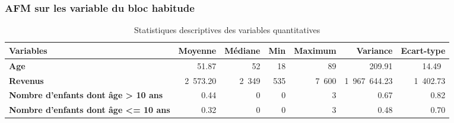 \documentclass[11pt,a4paper, x11names]{article}\usepackage[]{graphicx}\usepackage[]{color}
\makeatletter
\newenvironment{kframe}{%
 \def\at@end@of@kframe{}%
 \ifinner\ifhmode%
  \def\at@end@of@kframe{\end{minipage}}%
  \begin{minipage}{\columnwidth}%
 \fi\fi%
 \def\FrameCommand##1{\hskip\@totalleftmargin \hskip-\fboxsep
 \colorbox{shadecolor}{##1}\hskip-\fboxsep
     \hskip-\linewidth \hskip-\@totalleftmargin \hskip\columnwidth}%
 \MakeFramed {\advance\hsize-\width
   \@totalleftmargin\z@ \linewidth\hsize
   \@setminipage}}%
 {\par\unskip\endMakeFramed%
 \at@end@of@kframe}
\newenvironment{knitrout}{}{} %
\makeatother
\begin{document}
\subsubsection{AFM sur les variable du bloc habitude}
\begin{minipage}{0.49\linewidth}
\begin{mdframed}
\begin{knitrout}
\color{fgcolor}\begin{kframe}


{\ttfamily\noindent\bfseries\color{errorcolor}{\#\# Error in .get\_facto\_class(X): objet 'res.mfa\_logement' introuvable}}\end{kframe}
\end{knitrout}

\end{mdframed}
\end{minipage}

\begin{knitrout}
\color{fgcolor}\begin{kframe}


{\ttfamily\noindent\bfseries{}}\end{kframe}
\end{knitrout}



\begin{table*}[!h] \centering
\begin{small}
\begin{tabular}{@{}lrrrrrr@{}}\toprule
\textbf{Variables}& \textbf{Moyenne} & \textbf{Médiane}& \textbf{Min} & \textbf{Maximum} & \textbf{Variance} & \textbf{Ecart-type} \\ \midrule
\textbf{Age}          & 51.87 &  52 & 18 & 89 & 209.91 & 14.49\ \\ \hdashline
\textbf{Revenus}      & 2~573.20 & 2~349 & 535&7~600 & 1~967~644.23&1~402.73   \\ \hdashline
\textbf{Nombre d'enfants dont âge > 10 ans} &  0.44 & 0 & 0 & 3 & 0.67 & 0.82  \\  \hdashline
\textbf{Nombre d'enfants dont âge <= 10 ans} &  0.32 & 0 & 0 & 3 & 0.48 & 0.70 \\
\bottomrule
\end{tabular}
\end{small}
\caption{Statistiques descriptives des variables quantitatives}
\end{table*}
\end{document}
